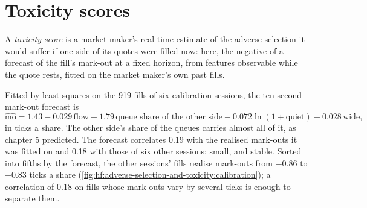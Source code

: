 \section{Toxicity scores}

\begin{definition}\label{def:hf:adverse-selection-and-toxicity:score}
A \emph{toxicity score} is a market maker's real-time estimate of the adverse selection it would suffer if one side of its
quotes were filled now: here, the negative of a forecast of the fill's mark-out at a fixed horizon, from features observable while the quote rests,
fitted on the market maker's own past fills.
\end{definition}

Fitted by least squares on the 919 fills of six calibration sessions, the ten-second mark-out forecast is
\[
\widehat{\mathrm{mo}}=1.43-0.029\,\text{flow}-1.79\,\text{queue share of the other side}-0.072\ln(1+\text{quiet})+0.028\,\text{wide},
\]
in ticks a share. The other side's share of the queues carries almost all of it, as chapter 5 predicted. The forecast correlates 0.19 with the
realised mark-outs it was fitted on and 0.18 with those of six other sessions: small, and stable. Sorted into fifths by the forecast, the other
sessions' fills realise mark-outs from $-0.86$ to $+0.83$ ticks a share (\cref{fig:hf:adverse-selection-and-toxicity:calibration}); a correlation of
0.18 on fills whose mark-outs vary by several ticks is enough to separate them.

\begin{omfigure}

\label{fig:hf:adverse-selection-and-toxicity:calibration}
\end{omfigure}

